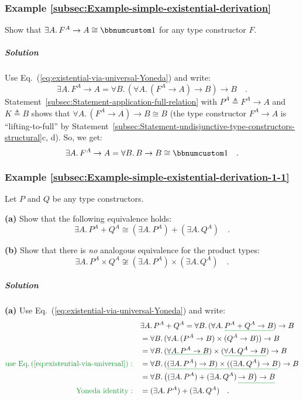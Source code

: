 \subsubsection{Example \label{subsec:Example-simple-existential-derivation}\ref{subsec:Example-simple-existential-derivation}}

Show that $\exists A.\,F^{A}\rightarrow A\cong\bbnum 1$ for any type
constructor $F$.

\subparagraph{Solution}

Use Eq.~(\ref{eq:existential-via-universal-Yoneda}) and write:
\[
\exists A.\,F^{A}\rightarrow A=\forall B.\,(\forall A.\,(F^{A}\rightarrow A)\rightarrow B)\rightarrow B\quad.
\]
Statement~\ref{subsec:Statement-application-full-relation} with
$P^{A}\triangleq F^{A}\rightarrow A$ and $K\triangleq B$ shows that
$\forall A.\,(F^{A}\rightarrow A)\rightarrow B\cong B$ (the type
constructor $F^{A}\rightarrow A$ is \textsf{``}lifting-to-full\textsf{''} by Statement~\ref{subsec:Statement-undisjunctive-type-constructors-structural}c,
d). So, we get:
\[
\exists A.\,F^{A}\rightarrow A=\forall B.\,B\rightarrow B\cong\bbnum 1\quad.
\]


\subsubsection{Example \label{subsec:Example-simple-existential-derivation-1-1}\ref{subsec:Example-simple-existential-derivation-1-1}}

Let $P$ and $Q$ be any type constructors.

\textbf{(a)} Show that the following equivalence holds: 
\[
\exists A.\,P^{A}+Q^{A}\cong(\exists A.\,P^{A})+(\exists A.\,Q^{A})\quad.
\]

\textbf{(b)} Show that there is \emph{no} analogous equivalence for
the product types:
\[
\exists A.\,P^{A}\times Q^{A}\not\cong(\exists A.\,P^{A})\times(\exists A.\,Q^{A})\quad.
\]


\subparagraph{Solution}

\textbf{(a)} Use Eq.~(\ref{eq:existential-via-universal-Yoneda})
and write:
\begin{align*}
 & \exists A.\,P^{A}+Q^{A}=\forall B.\,(\forall A.\,\gunderline{P^{A}+Q^{A}\rightarrow B})\rightarrow B\\
 & =\forall B.\,(\forall A.\,(P^{A}\rightarrow B)\times(Q^{A}\rightarrow B))\rightarrow B\\
 & =\forall B.\,(\gunderline{\forall A.\,P^{A}\rightarrow B})\times(\gunderline{\forall A.\,Q^{A}\rightarrow B})\rightarrow B\\
{\color{greenunder}\text{use Eq.\,(\ref{eq:existential-via-universal})}:}\quad & =\forall B.\,(\gunderline{(\exists A.\,P^{A})\rightarrow B)\times((\exists A.\,Q^{A})\rightarrow B})\rightarrow B\\
 & =\forall B.\,\big((\exists A.\,P^{A})+(\exists A.\,Q^{A})\,\gunderline{\rightarrow B\big)\rightarrow B}\\
{\color{greenunder}\text{Yoneda identity}:}\quad & =(\exists A.\,P^{A})+(\exists A.\,Q^{A})\quad.
\end{align*}


